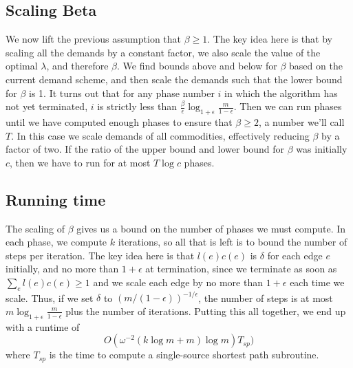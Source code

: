 \subsection{Scaling Beta}
We now lift the previous assumption that $\beta\geq 1$. The key idea
here is that by scaling all the demands by a constant factor, we also
scale the value of the optimal $\lambda$, and therefore $\beta$. We
find bounds above and below for $\beta$ based on the current demand
scheme, and then scale the demands such that the lower bound for
$\beta$ is 1. It turns out that for any phase number $i$ in which the
algorithm has not yet terminated, $i$ is strictly less than
$\frac{\beta}{\epsilon}\log_{1+\epsilon}\frac{m}{1-\epsilon}$. Then we
can run phases until we have computed enough
phases to ensure that $\beta\geq 2$, a number we'll call $T$. In this case
we scale demands of
all commodities, effectively reducing $\beta$ by a factor of
two. If the ratio of the upper bound and lower bound for $\beta$ was
initially $c$, then we have to run for at most $T\log c$ phases.
\subsection{Running time}
The scaling of $\beta$ gives us a bound on the number of phases we
must compute. In each phase, we compute $k$ iterations, so all that is
left is to bound the number of steps per iteration. The key idea here
is that $l(e)c(e)$ is $\delta$ for each edge $e$ initially, and no
more than $1+\epsilon$ at termination, since we terminate as soon as
$\sum_el(e)c(e)\geq 1$ and we scale each edge by no more than
$1+\epsilon$ each time we scale. Thus, if we set $\delta$ to $(m/(1-\epsilon))^{-1/\epsilon}$, the number of steps is at most
$m\log_{1+\epsilon}\frac{m}{1-\epsilon}$ plus the number of
iterations. Putting this all together, we end up with a runtime of 
$$O(\omega^{-2}(k\log m+m)\log m)T_{sp})$$ where $T_{sp}$ is the time to
compute a single-source shortest path subroutine.



